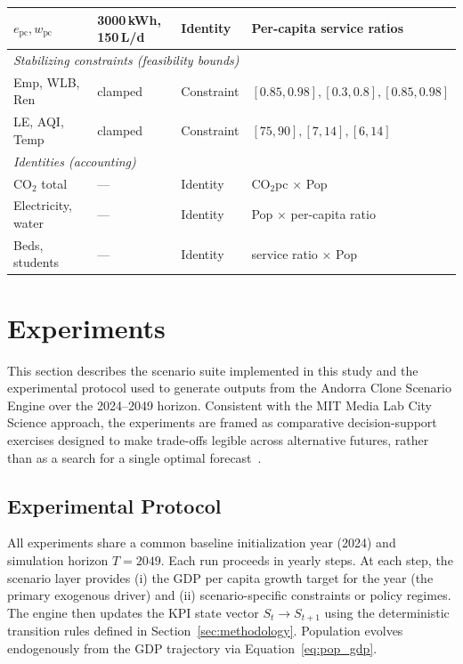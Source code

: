 \documentclass[urbansci,article,submit,pdftex,moreauthors]{Definitions/mdpi}
\begin{document}
\begin{table}[H]
\begin{threeparttable}
\begin{tabularx}{\textwidth}{lllX}
$e_\text{pc},w_\text{pc}$ & 3000\,kWh, 150\,L/d & Identity & Per-capita service ratios \\
\midrule
\multicolumn{4}{l}{\emph{Stabilizing constraints (feasibility bounds)}}\\
Emp, WLB, Ren          & clamped    & Constraint  & $[0.85,0.98],[0.3,0.8],[0.85,0.98]$ \\
LE, AQI, Temp          & clamped    & Constraint  & $[75,90],[7,14],[6,14]$ \\
\midrule
\multicolumn{4}{l}{\emph{Identities (accounting)}}\\
CO$_2$ total           & ---        & Identity    & CO$_2$pc $\times$ Pop \\
Electricity, water     & ---        & Identity    & Pop $\times$ per-capita ratio \\
Beds, students         & ---        & Identity    & service ratio $\times$ Pop \\
\bottomrule
\end{tabularx}
\end{threeparttable}
\end{table}

\section{Experiments}
\label{sec:experiments}

This section describes the scenario suite implemented in this study and the
experimental protocol used to generate outputs from the Andorra Clone Scenario
Engine over the 2024--2049 horizon. Consistent with the MIT Media Lab City
Science approach, the experiments are framed as comparative decision-support
exercises designed to make trade-offs legible across alternative futures, rather
than as a search for a single optimal forecast~\cite{orii2020methodology}.

\subsection{Experimental Protocol}
\label{subsec:exp_protocol}

All experiments share a common baseline initialization year (2024) and
simulation horizon $T=2049$. Each run proceeds in yearly steps. At each step,
the scenario layer provides (i) the GDP per capita growth target for the year
(the primary exogenous driver) and (ii) scenario-specific constraints or policy
regimes. The engine then updates the KPI state vector $S_t \rightarrow S_{t+1}$
using the deterministic transition rules defined in
Section~\ref{sec:methodology}. Population evolves endogenously from the GDP
trajectory via Equation~\eqref{eq:pop_gdp}.
\end{document}
